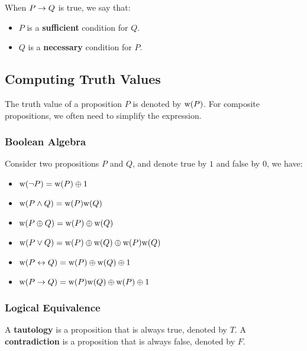 \begin{definition}
    When $P \rightarrow Q$ is true, we say that:
    \begin{itemize}
        \item $P$ is a \textbf{sufficient} condition for $Q$.
        \item $Q$ is a \textbf{necessary} condition for $P$.
    \end{itemize}
\end{definition}

\subsection{Computing Truth Values}

The truth value of a proposition $P$ is denoted by $\text{w(}P\text{)}$. For composite propositions,
we often need to simplify the expression.

\subsubsection{Boolean Algebra}

\begin{definition}
    Consider two propositions $P$ and $Q$, and denote true by $1$ and false by $0$, we have:
    \begin{itemize}
        \item $\text{w(}\neg P\text{)} = \text{w(}P\text{)} \oplus 1$
        \item $\text{w(}P \wedge Q\text{)} = \text{w(}P\text{)}\text{w(}Q\text{)}$
        \item $\text{w(}P \oplus Q\text{)} = \text{w(}P\text{)} \oplus \text{w(}Q\text{)}$
        \item $\text{w(}P \vee Q\text{)} = \text{w(}P\text{)} \oplus \text{w(}Q\text{)} \oplus \text{w(}P\text{)}\text{w(}Q\text{)}$
        \item $\text{w(}P \leftrightarrow Q\text{)} = \text{w(}P\text{)} \oplus \text{w(}Q\text{)} \oplus 1$
        \item $\text{w(}P \rightarrow Q\text{)} = \text{w(}P\text{)}\text{w(}Q\text{)} \oplus \text{w(}P\text{)} \oplus 1$
    \end{itemize}
\end{definition}

\subsubsection{Logical Equivalence}

\begin{definition}
    A \textbf{tautology} is a proposition that is always true, denoted by $T$.
    A \textbf{contradiction} is a proposition that is always false, denoted by $F$.
\end{definition}

